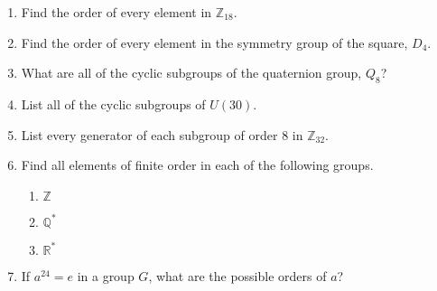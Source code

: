 {\begin{enumerate}
\begin{multicols}{3}
\begin{enumerate}
\item
$\displaystyle
\begin{pmatrix}
1 & -1 \\
0 & 1
\end{pmatrix}
$

\item
$\displaystyle
\begin{pmatrix}
1 & -1 \\
-1 & 0
\end{pmatrix}
$
 
\item
$\displaystyle
\begin{pmatrix}
\sqrt{3}/ 2 & 1/2 \\
-1/2 & \sqrt{3}/2
\end{pmatrix}
$

 \end{enumerate}
\end{multicols}

 

\item		  %
Find the order of every element in ${\mathbb Z}_{18}$.
 
 
\item
Find the order of every element in the symmetry group of the square,
$D_4$.
 
 
\item
What are all of the cyclic subgroups of the quaternion group, $Q_8$? 
 
 
\item
List all of the cyclic subgroups of $U(30)$.
 
 
\item
List every generator of each subgroup of order 8 in ${\mathbb
Z}_{32}$.
 
 
\item
Find all elements of finite order in each of the following groups. 
\begin{multicols}{3}
\begin{enumerate}
 
 \item
${\mathbb Z}$
 
 \item
${\mathbb Q}^\ast$
 
 \item
${\mathbb R}^\ast$
 
\end{enumerate}
 \end{multicols}
 
\item
If $a^{24} =e$ in a group $G$, what are the possible orders of $a$? 
 

\end{enumerate}}
